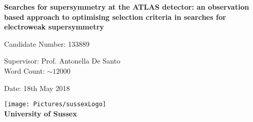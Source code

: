 \begin{titlepage}
\begin{center}

\vspace*{2cm} %
        
{\Large\textbf{Searches for supersymmetry at the ATLAS detector: an observation based approach to optimising selection criteria in searches for electroweak supersymmetry}}
        
\vspace{1cm} %
      

{\large Candidate Number: 133889

Supervisor: Prof. Antonella De Santo\\
        
       
Word Count: $\sim 12000$\

Date: 18th May 2018\\
        
}

\vspace{6cm} %

\texttt{[image: Pictures/sussexLogo]}\\

{\Large\textbf{University of Sussex}}
\end{center}
\end{titlepage}














